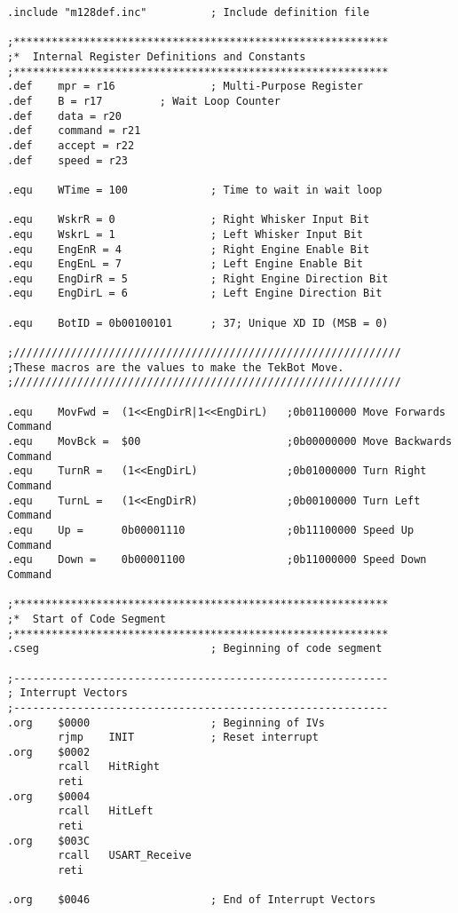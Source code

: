 \documentclass[12pt,letterpaper]{article}
\begin{document}
\begin{verbatim}
.include "m128def.inc"          ; Include definition file

;***********************************************************
;*  Internal Register Definitions and Constants
;***********************************************************
.def    mpr = r16               ; Multi-Purpose Register
.def    B = r17         ; Wait Loop Counter
.def    data = r20
.def    command = r21
.def    accept = r22
.def    speed = r23

.equ    WTime = 100             ; Time to wait in wait loop

.equ    WskrR = 0               ; Right Whisker Input Bit
.equ    WskrL = 1               ; Left Whisker Input Bit
.equ    EngEnR = 4              ; Right Engine Enable Bit
.equ    EngEnL = 7              ; Left Engine Enable Bit
.equ    EngDirR = 5             ; Right Engine Direction Bit
.equ    EngDirL = 6             ; Left Engine Direction Bit

.equ    BotID = 0b00100101      ; 37; Unique XD ID (MSB = 0)

;/////////////////////////////////////////////////////////////
;These macros are the values to make the TekBot Move.
;/////////////////////////////////////////////////////////////

.equ    MovFwd =  (1<<EngDirR|1<<EngDirL)   ;0b01100000 Move Forwards Command
.equ    MovBck =  $00                       ;0b00000000 Move Backwards Command
.equ    TurnR =   (1<<EngDirL)              ;0b01000000 Turn Right Command
.equ    TurnL =   (1<<EngDirR)              ;0b00100000 Turn Left Command
.equ    Up =      0b00001110                ;0b11100000 Speed Up Command
.equ    Down =    0b00001100                ;0b11000000 Speed Down Command

;***********************************************************
;*  Start of Code Segment
;***********************************************************
.cseg                           ; Beginning of code segment

;-----------------------------------------------------------
; Interrupt Vectors
;-----------------------------------------------------------
.org    $0000                   ; Beginning of IVs
        rjmp    INIT            ; Reset interrupt
.org    $0002
        rcall   HitRight
        reti
.org    $0004
        rcall   HitLeft
        reti
.org    $003C
        rcall   USART_Receive
        reti

.org    $0046                   ; End of Interrupt Vectors


\end{verbatim}
\end{document}
